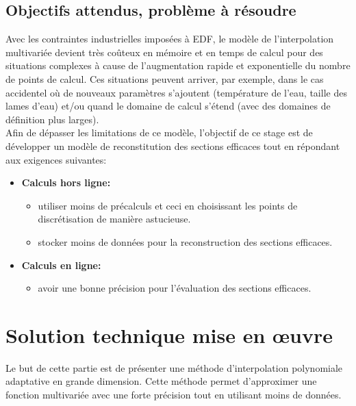 \subsection{Objectifs attendus, problème à résoudre}\label{sec:3.2}
\hspace{0.5cm}
Avec les contraintes industrielles imposées à EDF, le modèle de l'interpolation multivariée
devient très coûteux en mémoire et en temps de calcul pour des situations complexes à cause
de l'augmentation rapide et exponentielle du nombre de points de calcul.
Ces situations peuvent arriver, par exemple, dans le cas accidentel où de nouveaux
paramètres s'ajoutent (température de l'eau, taille des lames d'eau) et/ou quand le domaine
de calcul s'étend (avec des domaines de définition plus larges). \\

Afin de dépasser les limitations de ce modèle, l'objectif de ce stage est de développer
un modèle de reconstitution des sections efficaces tout en répondant aux exigences suivantes:
\begin{itemize}
		\item \textbf{Calculs hors ligne:}
		\begin{itemize}
				\item utiliser moins de précalculs et ceci en choisissant les points de discrétisation de manière astucieuse.
				\item stocker moins de données pour la reconstruction des sections efficaces.
		\end{itemize}

		\item \textbf{Calculs en ligne:} 
		\begin{itemize}
				\item avoir une bonne précision pour l'évaluation des sections efficaces.
		\end{itemize}

\end{itemize}

\newpage
\section{Solution technique mise en œuvre}\label{sec:4}
\hspace{0.5cm}
Le but de cette partie est de présenter une méthode d'interpolation polynomiale adaptative en grande dimension.
Cette méthode permet d'approximer une fonction multivariée avec une forte précision tout en
utilisant moins de données. \\

